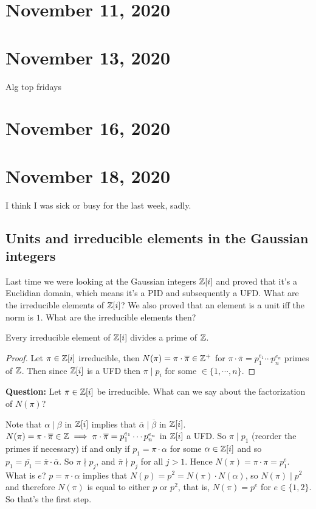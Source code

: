 \section{November 11, 2020}
\section{November 13, 2020}
Alg top fridays
\section{November 16, 2020}
\section{November 18, 2020}
I think I was sick or busy for the last week, sadly. 

\subsection{Units and irreducible elements in the Gaussian integers}

Last time we were looking at the Gaussian integers $\mathbb{Z}[i]$ and proved that it's a Euclidian domain, which means it's a PID and subsequently a UFD. What are the irreducible elements of $\mathbb{Z}[i]$? We also proved that an element is a unit iff the norm is $1$. What are the irreducible elements then? 
\begin{lemma}
    Every irreducible element of $\mathbb{Z}[i]$ divides a prime of $\mathbb{Z}$.
\end{lemma}
\begin{proof}
    Let $\pi\in \mathbb{Z}[i]$ irreducible, then $N(\pi)=\pi\cdot \overline{\pi}\in \mathbb{Z}^{+}$ for $\pi \cdot \overline{\pi}=p_1^{e_1}\cdots p_n ^{e_n }$ primes of $\mathbb{Z}$. Then since $\mathbb{Z}[i]$ is a UFD then $\pi  \mid p_i $ for some $\in \{1,\cdots ,n\} $.
\end{proof}
\noindent \textbf{Question:} Let $\pi\in \mathbb{Z}[i]$ be irreducible. What can we say about the factorization of $N(\pi)$?

Note that $\alpha  \mid \beta$ in $\mathbb{Z}[i]$ implies that $\overline{\alpha } \mid \overline{\beta }$ in $\mathbb{Z}[i]$. $N(\pi)=\pi\cdot \overline{\pi}\in \mathbb{Z}\implies \pi\cdot \overline{\pi}=p_1^{e_1}\cdots p_n ^{e_n }$ in $\mathbb{Z}[i]$ a UFD. So $\pi \mid p_1$ (reorder the primes if necessary) if and only if $p_1=\pi\cdot \alpha $ for some $\alpha \in \mathbb{Z}[i]$ and so $p_1=\overline{p_1}=\overline{\pi}\cdot \overline{\alpha }$. So $\pi\nmid p_j$, and $\overline{\pi}\nmid p_j $ for all $j>1$. Hence $N(\pi)=\pi\cdot \pi=p_1^{e}$. What is $e$? $p=\pi\cdot \alpha $ implies that $N(p)=p^2=N(\pi)\cdot N(\alpha )$, so $N(\pi) \mid p^2$ and therefore $N(\pi)$ is equal to either $p$ or $p^2$, that is, $N(\pi)=p^e$ for $e\in \{1,2\} $. So that's the first step.

